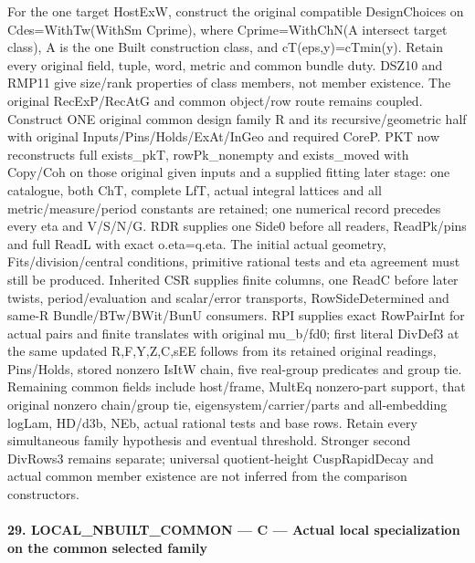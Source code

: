 For the one target HostExW, construct the original compatible DesignChoices on Cdes=WithTw(WithSm Cprime), where Cprime=WithChN(A intersect target class), A is the one Built construction class, and cT(eps,y)=cTmin(y). Retain every original field, tuple, word, metric and common bundle duty. DSZ10 and RMP11 give size/\allowbreak{}rank properties of class members, not member existence. The original RecExP/\allowbreak{}RecAtG and common object/\allowbreak{}row route remains coupled. Construct ONE original common design family R and its recursive/\allowbreak{}geometric half with original Inputs/\allowbreak{}Pins/\allowbreak{}Holds/\allowbreak{}ExAt/\allowbreak{}InGeo and required CoreP. PKT now reconstructs full exists\_\allowbreak{}pkT, rowPk\_\allowbreak{}nonempty and exists\_\allowbreak{}moved with Copy/\allowbreak{}Coh on those original given inputs and a supplied fitting later stage: one catalogue, both ChT, complete LfT, actual integral lattices and all metric/\allowbreak{}measure/\allowbreak{}period constants are retained; one numerical record precedes every eta and V/\allowbreak{}S/\allowbreak{}N/\allowbreak{}G. RDR supplies one Side0 before all readers, ReadPk/\allowbreak{}pins and full ReadL with exact o.eta=q.eta. The initial actual geometry, Fits/\allowbreak{}division/\allowbreak{}central conditions, primitive rational tests and eta agreement must still be produced. Inherited CSR supplies finite columns, one ReadC before later twists, period/\allowbreak{}evaluation and scalar/\allowbreak{}error transports, RowSideDetermined and same-R Bundle/\allowbreak{}BTw/\allowbreak{}BWit/\allowbreak{}BunU consumers. RPI supplies exact RowPairInt for actual pairs and finite translates with original mu\_\allowbreak{}b/\allowbreak{}fd0; first literal DivDef3 at the same updated R,F,Y,Z,C,sEE follows from its retained original readings, Pins/\allowbreak{}Holds, stored nonzero IsItW chain, five real-group predicates and group tie. Remaining common fields include host/\allowbreak{}frame, MultEq nonzero-part support, that original nonzero chain/\allowbreak{}group tie, eigensystem/\allowbreak{}carrier/\allowbreak{}parts and all-embedding logLam, HD/\allowbreak{}d3b, NEb, actual rational tests and base rows. Retain every simultaneous family hypothesis and eventual threshold. Stronger second DivRows3 remains separate; universal quotient-height CuspRapidDecay and actual common member existence are not inferred from the comparison constructors.

\paragraph{29. LOCAL\_\allowbreak{}NBUILT\_\allowbreak{}COMMON — C — Actual local specialization on the common selected family}

